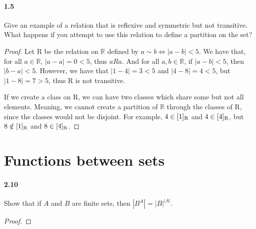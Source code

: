 \documentclass{book}
\begin{document}
\paragraph{1.5} Give an example of a relation that is reflexive and symmetric but not transitive. What happens if you attempt to use this relation to define a partition on the set?
\begin{proof}
Let R be the relation on $\mathbb{R}$ defined by $a \sim b \iff |a - b| < 5$. We have that, for all $a \in \mathbb{R}$,  $|a - a| = 0 < 5$, thus $aRa$. And for all $a, b \in \mathbb{R}$, if $|a - b| < 5$, then $|b - a| < 5$. However, we have that $|1 - 4| = 3 < 5$ and $|4 - 8| = 4 < 5$, but $|1 - 8| = 7 > 5$, thus R is not transitive.

If we create a class on R, we can have two classes which share some but not all elements. Meaning, we cannot create a partition of $\mathbb{R}$ through the classes of R, since the classes would not be disjoint. For example, $4 \in [1]\textsubscript{R}$ and $4 \in [4]\textsubscript{R}$, but $8 \notin [1]\textsubscript{R}$ and $8 \in [4]\textsubscript{R}$.
\end{proof}

\section{Functions between sets}
\paragraph{2.10} Show that if $A$ and $B$ are finite sets, then $|B^A| = |B|^{|A|}$.
\begin{proof}
\end{proof}
\end{document}
